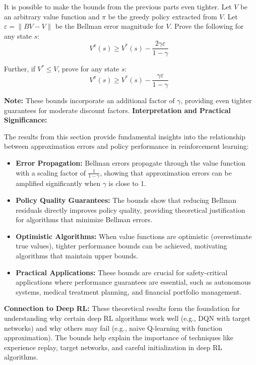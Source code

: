 \documentclass[12pt]{article}
\begin{document}
{{\begin{enumerate}[resume*]
    It is possible to make the bounds from the previous parts even tighter. Let \( V \) be an arbitrary value function and \( \pi \) be the greedy policy extracted from \( V \). Let \( \varepsilon = \|BV - V\| \) be the Bellman error magnitude for \( V \). Prove the following for any state \( s \):
    \[
    V^{\pi}(s) \geq V^{*}(s) - \frac{2\gamma \varepsilon}{1 - \gamma}
    \]
    
    Further, if \( V^{*} \leq V \), prove for any state \( s \):
    \[
    V^{\pi}(s) \geq V^{*}(s) - \frac{\gamma \varepsilon}{1 - \gamma}
    \]
    
    \textbf{Note:} These bounds incorporate an additional factor of \( \gamma \), providing even tighter guarantees for moderate discount factors.
\textbf{Interpretation and Practical Significance:}

The results from this section provide fundamental insights into the relationship between approximation errors and policy performance in reinforcement learning:

\begin{itemize}
    \item \textbf{Error Propagation:} Bellman errors propagate through the value function with a scaling factor of \( \frac{1}{1-\gamma} \), showing that approximation errors can be amplified significantly when \( \gamma \) is close to 1.
    
    \item \textbf{Policy Quality Guarantees:} The bounds show that reducing Bellman residuals directly improves policy quality, providing theoretical justification for algorithms that minimize Bellman errors.
    
    \item \textbf{Optimistic Algorithms:} When value functions are optimistic (overestimate true values), tighter performance bounds can be achieved, motivating algorithms that maintain upper bounds.
    
    \item \textbf{Practical Applications:} These bounds are crucial for safety-critical applications where performance guarantees are essential, such as autonomous systems, medical treatment planning, and financial portfolio management.
\end{itemize}

\textbf{Connection to Deep RL:} These theoretical results form the foundation for understanding why certain deep RL algorithms work well (e.g., DQN with target networks) and why others may fail (e.g., naive Q-learning with function approximation). The bounds help explain the importance of techniques like experience replay, target networks, and careful initialization in deep RL algorithms.


\end{enumerate}}}
\end{document}
